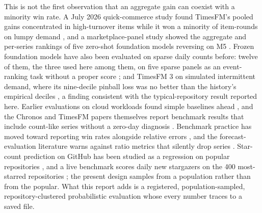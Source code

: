 This is not the first observation that an aggregate gain can coexist with a minority win rate. A July 2026
quick-commerce study found TimesFM's pooled gains concentrated in high-turnover items while it won a minority
of item-rounds on lumpy demand \citep{kim2026}, and a marketplace-panel study showed the aggregate and
per-series rankings of five zero-shot foundation models reversing on M5 \citep{islam2026}. Frozen foundation
models have also been evaluated on sparse daily counts before: twelve of them, the three used here among
them, on five sparse panels as an event-ranking task without a proper score \citep{schoess2026}; and TimesFM 3
on simulated intermittent demand, where its nine-decile pinball loss was no better than the history's
empirical deciles \citep{ebrahim2026}, a finding consistent with the typical-repository result reported here.
Earlier evaluations on cloud workloads found simple baselines ahead \citep{toner2025}, and the Chronos and
TimesFM papers themselves report benchmark results that include count-like series without a zero-day
diagnosis \citep{ansari2024, das2023}. Benchmark practice has moved toward reporting win rates alongside
relative errors \citep{fevbench2026}, and the forecast-evaluation literature warns against ratio metrics that
silently drop series \citep{hewamalage2023}. Star-count prediction on GitHub has been studied as a regression
on popular repositories \citep{borges2016}, and a live benchmark scores daily new stargazers on the 400
most-starred repositories \citep{garza2026}; the present design samples from a population rather than from
the popular. What this report adds is a registered, population-sampled, repository-clustered probabilistic
evaluation whose every number traces to a saved file.
